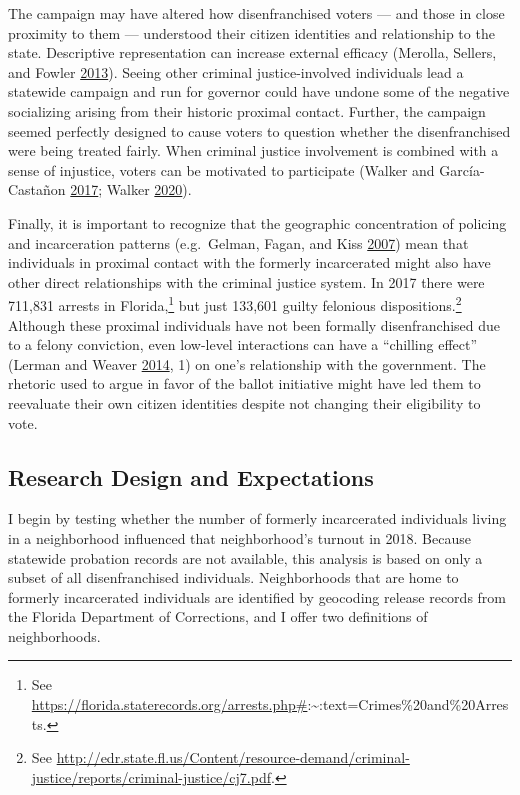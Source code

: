 \documentclass[
  12pt,
]{article}
\begin{document}
The campaign may have altered how disenfranchised voters --- and those in close proximity to them --- understood their citizen identities and relationship to the state. Descriptive representation can increase external efficacy (Merolla, Sellers, and Fowler \protect\hyperlink{ref-Merolla2013}{2013}). Seeing other criminal justice-involved individuals lead a statewide campaign and run for governor could have undone some of the negative socializing arising from their historic proximal contact. Further, the campaign seemed perfectly designed to cause voters to question whether the disenfranchised were being treated fairly. When criminal justice involvement is combined with a sense of injustice, voters can be motivated to participate (Walker and García-Castañon \protect\hyperlink{ref-Walker2017}{2017}; Walker \protect\hyperlink{ref-Walker2020}{2020}).

Finally, it is important to recognize that the geographic concentration of policing and incarceration patterns (e.g.~Gelman, Fagan, and Kiss \protect\hyperlink{ref-Gelman2007}{2007}) mean that individuals in proximal contact with the formerly incarcerated might also have other direct relationships with the criminal justice system. In 2017 there were 711,831 arrests in Florida,\footnote{See \url{https://florida.staterecords.org/arrests.php\#}:\textasciitilde:text=Crimes\%20and\%20Arrests.} but just 133,601 guilty felonious dispositions.\footnote{See \url{http://edr.state.fl.us/Content/resource-demand/criminal-justice/reports/criminal-justice/cj7.pdf}.} Although these proximal individuals have not been formally disenfranchised due to a felony conviction, even low-level interactions can have a ``chilling effect'' (Lerman and Weaver \protect\hyperlink{ref-Lerman2014}{2014}, 1) on one's relationship with the government. The rhetoric used to argue in favor of the ballot initiative might have led them to reevaluate their own citizen identities despite not changing their eligibility to vote.

\hypertarget{research-design-and-expectations}{%
\subsection*{Research Design and Expectations}\label{research-design-and-expectations}}

I begin by testing whether the number of formerly incarcerated individuals living in a neighborhood influenced that neighborhood's turnout in 2018. Because statewide probation records are not available, this analysis is based on only a subset of all disenfranchised individuals. Neighborhoods that are home to formerly incarcerated individuals are identified by geocoding release records from the Florida Department of Corrections, and I offer two definitions of neighborhoods.
\end{document}
